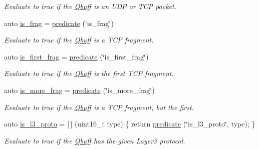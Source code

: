 \begin{DoxyCompactItemize}
\begin{DoxyCompactList}\small\item\em Evaluate to {\ttfamily true} if the \hyperlink{structpfq_1_1lang_1_1Qbuff}{Qbuff} is an U\+DP or T\+CP packet. \end{DoxyCompactList}\item 
auto \hyperlink{namespacepfq_1_1lang_1_1anonymous__namespace_02default_8hpp_03_af042e092c925ae6306ae85ae5a56563d}{is\+\_\+frag} = \hyperlink{namespacepfq_1_1lang_aca9adafc436b7f851621b979fa1aaf88}{predicate} (\char`\"{}is\+\_\+frag\char`\"{})
\begin{DoxyCompactList}\small\item\em Evaluate to {\ttfamily true} if the \hyperlink{structpfq_1_1lang_1_1Qbuff}{Qbuff} is a T\+CP fragment. \end{DoxyCompactList}\item 
auto \hyperlink{namespacepfq_1_1lang_1_1anonymous__namespace_02default_8hpp_03_afb797cc442d04e614a9ac68c7c4c35ff}{is\+\_\+first\+\_\+frag} = \hyperlink{namespacepfq_1_1lang_aca9adafc436b7f851621b979fa1aaf88}{predicate} (\char`\"{}is\+\_\+first\+\_\+frag\char`\"{})
\begin{DoxyCompactList}\small\item\em Evaluate to {\ttfamily true} if the \hyperlink{structpfq_1_1lang_1_1Qbuff}{Qbuff} is the first T\+CP fragment. \end{DoxyCompactList}\item 
auto \hyperlink{namespacepfq_1_1lang_1_1anonymous__namespace_02default_8hpp_03_a0b169afb2f21c8626f06f77ca75feded}{is\+\_\+more\+\_\+frag} = \hyperlink{namespacepfq_1_1lang_aca9adafc436b7f851621b979fa1aaf88}{predicate} (\char`\"{}is\+\_\+more\+\_\+frag\char`\"{})
\begin{DoxyCompactList}\small\item\em Evaluate to {\ttfamily true} if the \hyperlink{structpfq_1_1lang_1_1Qbuff}{Qbuff} is a T\+CP fragment, but the first. \end{DoxyCompactList}\item 
auto \hyperlink{namespacepfq_1_1lang_1_1anonymous__namespace_02default_8hpp_03_a814bb9c3c833dc2af342d695b1d503e8}{is\+\_\+l3\+\_\+proto} = \mbox{[}$\,$\mbox{]} (uint16\+\_\+t type) \{ return \hyperlink{namespacepfq_1_1lang_aca9adafc436b7f851621b979fa1aaf88}{predicate} (\char`\"{}is\+\_\+l3\+\_\+proto\char`\"{}, type); \}
\begin{DoxyCompactList}\small\item\em Evaluate to {\ttfamily true} if the \hyperlink{structpfq_1_1lang_1_1Qbuff}{Qbuff} has the given Layer3 protocol. \end{DoxyCompactList}\item 

\end{DoxyCompactItemize}
